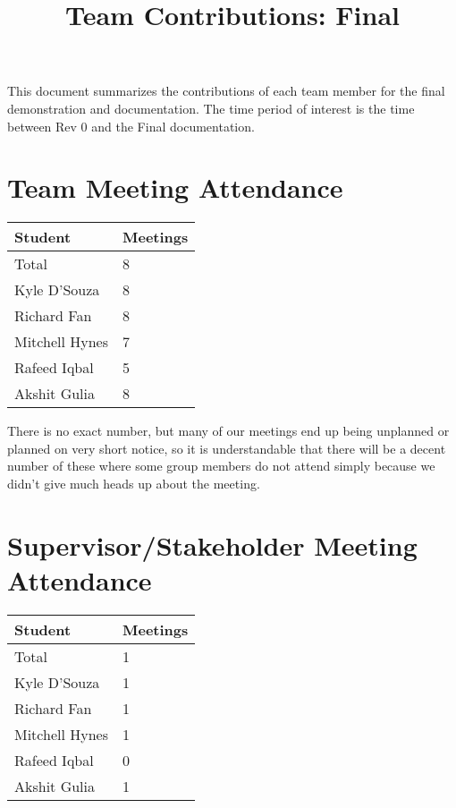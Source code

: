 \documentclass{article}
\title{Team Contributions: Final\\\progname}
\author{\authname}
\date{}
\begin{document}
\maketitle

This document summarizes the contributions of each team member for the final
demonstration and documentation.  The time period of interest is the time
between Rev 0 and the Final documentation.

\section{Team Meeting Attendance}

\begin{table}[H]
  \centering
  \begin{tabular}{ll}
    \toprule
    \textbf{Student} & \textbf{Meetings}\\
    \midrule
    Total & 8\\
    Kyle D'Souza & 8\\
    Richard Fan & 8\\
    Mitchell Hynes & 7\\
    Rafeed Iqbal & 5\\
    Akshit Gulia & 8\\
    \bottomrule
  \end{tabular}
\end{table}

There is no exact number, but many of our meetings end up being
unplanned or planned on very short notice, so it is understandable
that there will be a decent number of these where some group members
do not attend simply because we didn't give much heads up about the meeting.

\section{Supervisor/Stakeholder Meeting Attendance}

\begin{table}[H]
  \centering
  \begin{tabular}{ll}
    \toprule
    \textbf{Student} & \textbf{Meetings}\\
    \midrule
    Total & 1\\
    Kyle D'Souza & 1\\
    Richard Fan & 1\\
    Mitchell Hynes & 1\\
    Rafeed Iqbal & 0\\
    Akshit Gulia & 1\\
    \bottomrule
  \end{tabular}
\end{table}
\end{document}
